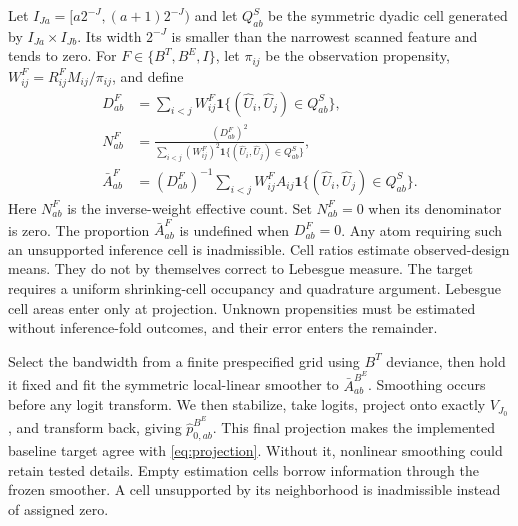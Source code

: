 \documentclass[11pt]{article}
\theoremstyle{definition}
\newcommand{\1}{\mathbf 1}\newcommand{\op}{\operatorname}
\begin{document}
Let $I_{Ja}=[a2^{-J},(a+1)2^{-J})$ and let $Q_{ab}^S$ be the symmetric dyadic cell generated by $I_{Ja}\times I_{Jb}$.  Its width $2^{-J}$ is smaller than the narrowest scanned feature and tends to zero.  For $F\in\{B^T,B^E,I\}$, let $\pi_{ij}$ be the observation propensity, $W_{ij}^F=R_{ij}^FM_{ij}/\pi_{ij}$, and define
\begin{align}
 D_{ab}^{F}&=\sum_{i<j}W_{ij}^{F}\1\{(\widehat U_i,\widehat U_j)\in Q_{ab}^S\},\nonumber\\
 N_{ab}^{F}&=\frac{(D_{ab}^{F})^2}
 {\sum_{i<j}(W_{ij}^{F})^2\1\{(\widehat U_i,\widehat U_j)\in Q_{ab}^S\}},\nonumber\\
 \bar A_{ab}^{F}&=(D_{ab}^{F})^{-1}
 \sum_{i<j}W_{ij}^{F}A_{ij}\1\{(\widehat U_i,\widehat U_j)\in Q_{ab}^S\}.
                                                                    \label{eq:cellcounts}
\end{align}
Here $N_{ab}^F$ is the inverse-weight effective count.  Set $N_{ab}^F=0$ when
its denominator is zero.  The proportion
$\bar A_{ab}^F$ is undefined when $D_{ab}^F=0$.  Any atom requiring such an
unsupported inference cell is inadmissible.  Cell ratios estimate observed-design
means.  They do not by themselves correct to Lebesgue measure.  The target requires a
uniform shrinking-cell occupancy and quadrature argument.  Lebesgue cell areas enter
only at projection.  Unknown propensities must be estimated without inference-fold
outcomes, and their error enters the remainder.

Select the bandwidth from a finite prespecified grid using $B^T$ deviance, then hold it fixed and fit the symmetric local-linear smoother to $\bar A_{ab}^{B^E}$.  Smoothing occurs before any logit transform.  We then stabilize, take logits, project onto exactly $V_{J_0}$, and transform back, giving $\widehat p_{0,ab}^{B^E}$.  This final projection makes the implemented baseline target agree with \eqref{eq:projection}.  Without it, nonlinear smoothing could retain tested details.  Empty estimation cells borrow information through the frozen smoother.  A cell unsupported by its neighborhood is inadmissible instead of assigned zero.
\end{document}
